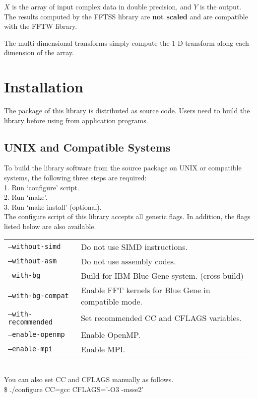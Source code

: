 \documentclass{article}
\begin{document}
$X$ is the array of input complex data in double precision,
and $Y$ is the output.
The results computed by the FFTSS library are {\bf not scaled} and
are compatible with the FFTW library.

The multi-dimensional transforms simply compute the 1-D transform along
each dimension of the array. 

\section{Installation}
The package of this library is distributed as source code.
Users need to build the library before using from application programs.

\subsection{UNIX and Compatible Systems}
To build the library software from the source package on UNIX or
compatible systems,
the following three steps are required:\\ 
1. Run `configure' script.\\
2. Run `make'.\\
3. Run `make install' (optional).\\

The configure script of this library accepts all generic flags.
 In addition, the flags listed below are also available.\\

\begin{tabular}{ll}
{\tt --without-simd}&Do not use SIMD instructions.\\
{\tt --without-asm}&Do not use assembly codes.\\
{\tt --with-bg}&Build for IBM Blue Gene system. (cross build)\\
{\tt --with-bg-compat}&Enable FFT kernels for Blue Gene in compatible mode.\\
{\tt --with-recommended}&Set recommended CC and CFLAGS variables.\\
{\tt --enable-openmp}&Enable OpenMP.\\
{\tt --enable-mpi}&Enable MPI.\\
\end{tabular}\\

You can also set CC and CFLAGS manually as follows.\\
\$ ./configure CC=gcc CFLAGS='-O3 -msse2'\\
\end{document}
